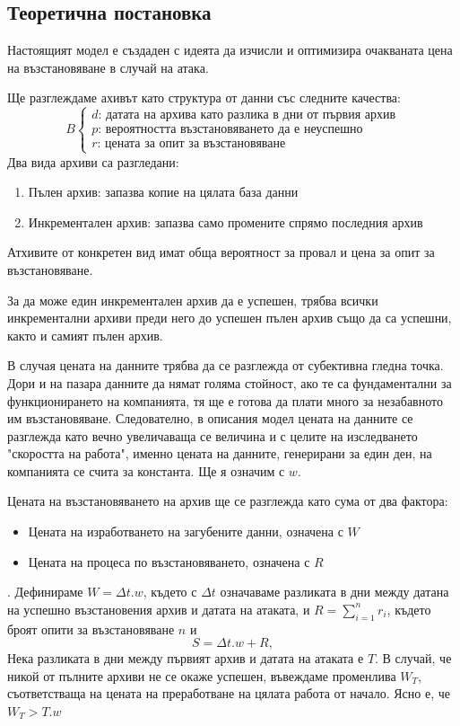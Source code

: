 \documentclass[11pt, a4paper]{article}
\theoremstyle{definition}
\begin{document}
		\subsection{Теоретична постановка}
			Настоящият модел е създаден с идеята да изчисли и оптимизира очакваната цена на възстановяване в случай на атака.\par
			Ще разглеждаме ахивът като структура от данни със следните качества:
			$$
			B
			\begin{cases}
			d \text{: датата на архива като разлика в дни от първия архив}\\
			p \text{: вероятността възстановяването да е неуспешно}\\
			r \text{: цената за опит за възстановяване}
			\end{cases}
			$$
			Два вида архиви са разгледани:
			\begin{enumerate}
				\item Пълен архив: запазва копие на цялата база данни
				\item Инкрементален архив: запазва само промените спрямо последния архив
			\end{enumerate}
			Атхивите от конкретен вид имат обща вероятност за провал и цена за опит за възстановяване. \par
			За да може един инкрементален архив да е успешен, трябва всички инкрементални архиви преди него до успешен пълен архив също да са успешни, както и самият пълен архив.\par
			В случая цената на данните трябва да се разглежда от субективна гледна точка. Дори и на пазара данните да нямат голяма стойност, ако те са фундаментални за функционирането на компанията, тя ще е готова да плати много за незабавното им възстановяване. Следователно, в описания модел цената на данните се разглежда като вечно увеличаваща се величина и с целите на изследването "скоростта на работа", именно цената на данните, генерирани за един ден, на компанията се счита за константа. Ще я означим с $w$.\par
			Цената на възстановяването на архив ще се разглежда като сума от два фактора:
			\begin{itemize}
				\item Цената на изработването на загубените данни, означена с $W$
				\item Цената на процеса по възстановяването, означена с $R$
			\end{itemize}.
			Дефинираме $W = \Delta t.w$, където с $\Delta t$ означаваме разликата в дни между датана на успешно възстановения архив и датата на атаката, и $R = \sum_{i=1}^{n} r_i$, където броят опити за възстановяване $n$ и 
			$$
			S=\Delta t.w + R,
			$$
			Нека разликата в дни между първият архив и датата на атаката е $T$. В случай, че никой от пълните архиви не се окаже успешен, въвеждаме променлива $W_T$, съответстваща на цената на преработване на цялата работа от начало. Ясно е, че $W_T>T.w$\par
\end{document}
